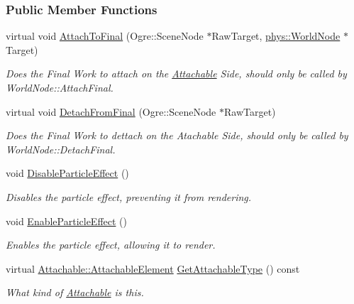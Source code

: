 \subsubsection*{Public Member Functions}
\begin{DoxyCompactItemize}
\item 
virtual void \hyperlink{classphys_1_1ParticleEffect_a83a533b22d3926775562bdf0a1dd8e5b}{AttachToFinal} (Ogre::SceneNode $\ast$RawTarget, \hyperlink{classphys_1_1WorldNode}{phys::WorldNode} $\ast$Target)
\begin{DoxyCompactList}\small\item\em Does the Final Work to attach on the \hyperlink{classphys_1_1Attachable}{Attachable} Side, should only be called by WorldNode::AttachFinal. \item\end{DoxyCompactList}\item 
virtual void \hyperlink{classphys_1_1ParticleEffect_a6cecfcd4177514f4323c653d0ea2c2c5}{DetachFromFinal} (Ogre::SceneNode $\ast$RawTarget)
\begin{DoxyCompactList}\small\item\em Does the Final Work to dettach on the Atachable Side, should only be called by WorldNode::DetachFinal. \item\end{DoxyCompactList}\item 
void \hyperlink{classphys_1_1ParticleEffect_abd9f2339d22582055fe4ae45f986ff8c}{DisableParticleEffect} ()
\begin{DoxyCompactList}\small\item\em Disables the particle effect, preventing it from rendering. \item\end{DoxyCompactList}\item 
void \hyperlink{classphys_1_1ParticleEffect_aee95ac9b688885361d3066a5a4b83965}{EnableParticleEffect} ()
\begin{DoxyCompactList}\small\item\em Enables the particle effect, allowing it to render. \item\end{DoxyCompactList}\item 
virtual \hyperlink{classphys_1_1Attachable_acd1fca033e7cc0bb3024a92d466d213a}{Attachable::AttachableElement} \hyperlink{classphys_1_1ParticleEffect_a86553a292cee35953b98d1d7e34b6a0d}{GetAttachableType} () const 
\begin{DoxyCompactList}\small\item\em What kind of \hyperlink{classphys_1_1Attachable}{Attachable} is this. \item\end{DoxyCompactList}\item 

\end{DoxyCompactItemize}

